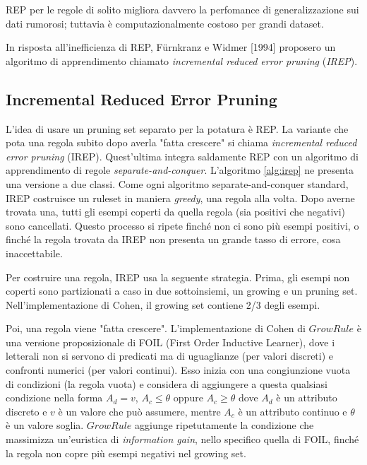 REP per le regole di solito migliora davvero la perfomance di generalizzazione sui dati rumorosi\cite{Pagallo1990}\cite{Brunk91aninvestigation}\cite{Weiss91reducedcomplexity}\cite{Furnkranz94incrementalreduced}; tuttavia è computazionalmente costoso per grandi dataset\cite{Cohen93efficientpruning}.

In risposta all'inefficienza di REP, Fürnkranz e Widmer [1994] proposero un algoritmo di apprendimento chiamato \textit{incremental reduced error pruning} (\textit{IREP})\cite{Furnkranz94incrementalreduced}.

\subsection*{Incremental Reduced Error Pruning}
L'idea di usare un pruning set separato per la potatura è REP. La variante che pota una regola subito dopo averla "fatta crescere" si chiama \textit{incremental reduced error pruning} (IREP)\cite{2Witten:2011:DMP:1972514}. Quest'ultima integra saldamente REP con un algoritmo di apprendimento di regole \textit{separate-and-conquer}. L'algoritmo \ref{alg:irep} ne presenta una versione a due classi. Come ogni algoritmo separate-and-conquer standard, IREP costruisce un ruleset in maniera \textit{greedy}, una regola alla volta. Dopo averne trovata una, tutti gli esempi coperti da quella regola (sia positivi che negativi) sono cancellati. Questo processo si ripete finché non ci sono più esempi positivi, o finché la regola trovata da IREP non presenta un grande tasso di errore, cosa inaccettabile.

Per costruire una regola, IREP usa la seguente strategia. Prima, gli esempi non coperti sono partizionati a caso in due sottoinsiemi, un growing e un pruning set. Nell'implementazione di Cohen, il growing set contiene 2/3 degli esempi.

Poi, una regola viene "fatta crescere". L'implementazione di Cohen di $GrowRule$ è una versione proposizionale di FOIL (First Order Inductive Learner), dove i letterali non si servono di predicati ma di uguaglianze (per valori discreti) e confronti numerici (per valori continui)\cite{Russell:2003:AIM:773294}. Esso inizia con una congiunzione vuota di condizioni (la regola vuota) e considera di aggiungere a questa qualsiasi condizione nella forma $A_d=v$, $A_c \leq \theta$ oppure $A_c \geq \theta$ dove $A_d$ è un attributo discreto e $v$ è un valore che può assumere, mentre $A_c$ è un attributo continuo e $\theta$ è un valore soglia. $GrowRule$ aggiunge ripetutamente la condizione che massimizza un'euristica di \emph{information gain}, nello specifico quella di FOIL, finché la regola non copre più esempi negativi nel growing set.

